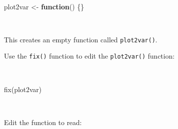 \documentclass[
  12pt,
  a4paper]{book}
\newenvironment{Shaded}{\begin{snugshade}}{\end{snugshade}}
\newcommand{\ControlFlowTok}[1]{\textcolor[rgb]{0.13,0.29,0.53}{\textbf{#1}}}
\newcommand{\FunctionTok}[1]{\textcolor[rgb]{0.00,0.00,0.00}{#1}}
\newcommand{\NormalTok}[1]{#1}
\newcommand{\OtherTok}[1]{\textcolor[rgb]{0.56,0.35,0.01}{#1}}
\begin{document}
~

\begin{Shaded}
\begin{Highlighting}[]
\NormalTok{plot2var }\OtherTok{\textless{}{-}} \ControlFlowTok{function}\NormalTok{() \{\}}
\end{Highlighting}
\end{Shaded}

~

This creates an empty function called \texttt{plot2var()}.

Use the \texttt{fix()} function to edit the \texttt{plot2var()} function:

~

\begin{Shaded}
\begin{Highlighting}[]
\FunctionTok{fix}\NormalTok{(plot2var)}
\end{Highlighting}
\end{Shaded}

~

Edit the function to read:

~
\end{document}
